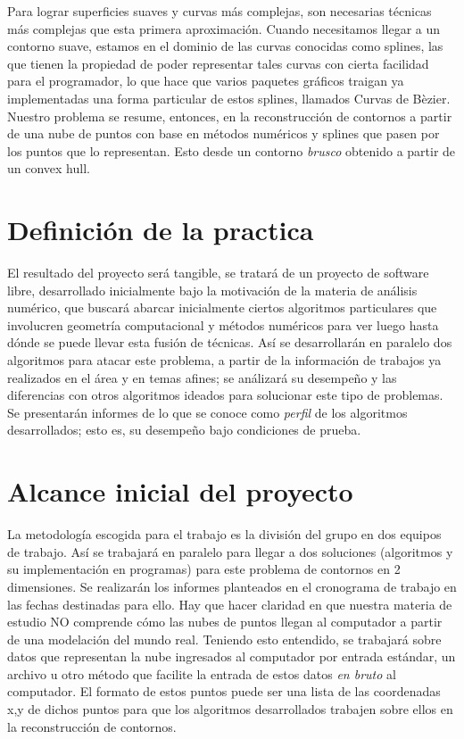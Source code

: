 \documentclass[final, 12pt letterpaper]{article}
\begin{document}
Para lograr superficies suaves y curvas más complejas, son necesarias técnicas más complejas que esta primera aproximación. Cuando necesitamos llegar a un contorno suave, estamos en el dominio de las curvas conocidas como splines, las que tienen la propiedad de poder representar tales curvas con cierta facilidad para el programador, lo que hace que varios paquetes gráficos traigan ya implementadas una forma particular de estos splines, llamados Curvas de Bèzier.
Nuestro problema se resume, entonces, en la reconstrucción de contornos a partir de una nube de puntos con base en métodos numéricos y splines que pasen por los puntos que lo representan. Esto desde un contorno \emph{brusco} obtenido a partir de un convex hull.

\section{Definición de la practica}
El resultado del proyecto será tangible, se tratará de un proyecto de software libre, desarrollado inicialmente bajo la motivación de la materia de análisis numérico, que buscará abarcar inicialmente ciertos algoritmos particulares que involucren geometría computacional y métodos numéricos para ver luego hasta dónde se puede llevar esta fusión de técnicas. Así se desarrollarán en paralelo dos algoritmos para atacar este problema, a partir de la información de trabajos ya realizados en el área y en temas afines; se análizará su desempeño y las diferencias con otros algoritmos ideados para solucionar este tipo de problemas. Se presentarán informes de lo que se conoce como \emph{perfil} de los algoritmos desarrollados; esto es, su desempeño bajo condiciones de prueba.
\section{Alcance inicial del proyecto}
La metodología escogida para el trabajo es la división del grupo en dos equipos de trabajo. Así se trabajará en paralelo para llegar a dos soluciones (algoritmos y su implementación en programas) para este problema de contornos en 2 dimensiones. Se realizarán los informes planteados en el cronograma de trabajo en las fechas destinadas para ello. Hay que hacer claridad en que nuestra materia de estudio NO comprende cómo las nubes de puntos llegan al computador a partir de una modelación del mundo real. Teniendo esto entendido, se trabajará sobre datos que representan la nube ingresados al computador por entrada estándar, un archivo u otro método que facilite la entrada de estos datos \emph{en bruto} al computador. El formato de estos puntos puede ser una lista de las coordenadas x,y de dichos puntos para que los algoritmos desarrollados trabajen sobre ellos en la reconstrucción de contornos.
\end{document}
